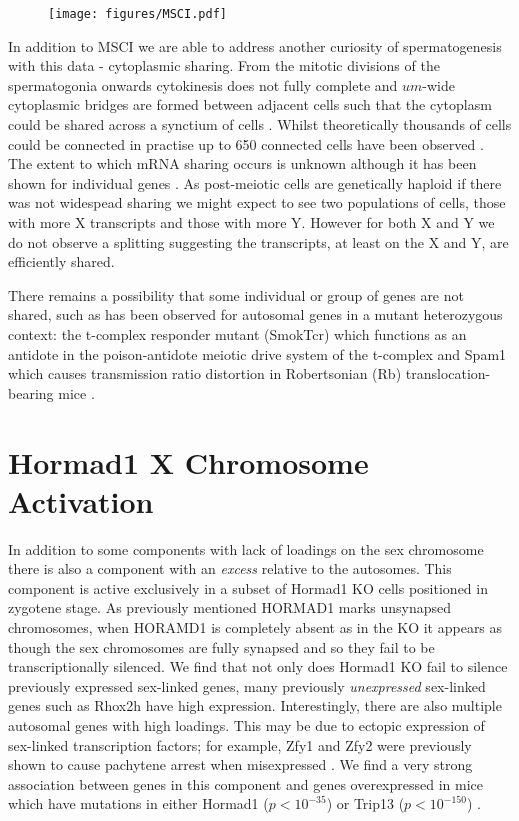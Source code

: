 \begin{figure}[H]
	\centering
	\texttt{[image: figures/MSCI.pdf]}
	\caption{}
	\label{fig:MSCI}
\end{figure}

In addition to MSCI we are able to address another curiosity of spermatogenesis with this data - cytoplasmic sharing. From the mitotic divisions of the spermatogonia onwards cytokinesis does not fully complete and $um$-wide cytoplasmic bridges are formed between adjacent cells such that the cytoplasm could be shared across a synctium of cells \cite{Greenbaum2011Germ}. Whilst theoretically thousands of cells could be connected in practise up to 650 connected cells have been observed \cite{ren1991clonal}. The extent to which mRNA sharing occurs is unknown although it has been shown for individual genes \cite{braun1989genetically}. As post-meiotic cells are genetically haploid if there was not widespead sharing we might expect to see two populations of cells, those with more X transcripts and those with more Y. However for both X and Y we do not observe a splitting suggesting the transcripts, at least on the X and Y, are efficiently shared.

There remains a possibility that some individual or group of genes are not shared, such as has been observed for autosomal genes in a mutant heterozygous context: the t-complex responder mutant (SmokTcr) which functions as an antidote in the poison-antidote meiotic drive system of the t-complex \cite{Veron2009retention} and Spam1 which causes transmission ratio distortion in Robertsonian (Rb) translocation-bearing mice \cite{martin2005spam1}.


\section{Hormad1 X Chromosome Activation}
In addition to some components with lack of loadings on the sex chromosome there is also a component with an \textit{excess} relative to the autosomes. This component is active exclusively in a subset of Hormad1 KO cells positioned in zygotene stage. As previously mentioned HORMAD1 marks unsynapsed chromosomes, when HORAMD1 is completely absent as in the KO it appears as though the sex chromosomes are fully synapsed and so they fail to be transcriptionally silenced. We find that not only does Hormad1 KO fail to silence previously expressed sex-linked genes, many previously \textit{unexpressed} sex-linked genes such as Rhox2h have high expression. Interestingly, there are also multiple autosomal genes with high loadings. This may be due to ectopic expression of sex-linked transcription factors; for example, Zfy1 and Zfy2 were previously shown to cause pachytene arrest when misexpressed \cite{royo2010evidence}. We find a very strong association between genes in this component and genes overexpressed in mice which have mutations in either Hormad1 ($p<10^{-35}$) or Trip13 ($p<10^{-150}$) \cite{ortega2016surveillance}.

